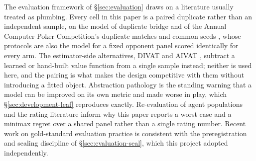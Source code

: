 The evaluation framework of \S\ref{sec:evaluation} draws on a literature usually treated as
plumbing. Every cell in this paper is a paired duplicate rather than an independent sample, on the model of
duplicate bridge and of the Annual Computer Poker Competition's duplicate matches and common seeds
\cite{acpc}, whose protocols are also the model for a fixed opponent panel scored identically for
every arm. The estimator-side alternatives, DIVAT \cite{zinkevich-divat} and AIVAT
\cite{burch-aivat}, subtract a learned or hand-built value function from a single sample instead;
neither is used here, and the pairing is what makes the design competitive with them without
introducing a fitted object. Abstraction pathology
\cite{waugh-abstraction} is the standing warning that a model can be improved on its own metric and
made worse in play, which \S\ref{sec:development-leaf} reproduces exactly. Re-evaluation of agent
populations \cite{balduzzi-reeval} and the rating literature
\cite{coulom-whr,herbrich-trueskill,nelo} inform why this paper reports a worst case and a minimax
regret over a shared panel rather than a single rating number. Recent work on gold-standard
evaluation practice \cite{kelidari2026goldstandard} is consistent with the preregistration and
sealing discipline of \S\ref{sec:evaluation-seal}, which this project adopted independently.
